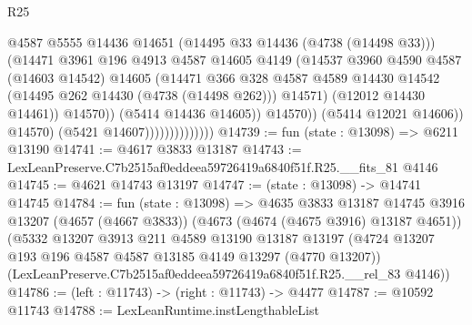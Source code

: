 \begin{lexlean}{R25}
\begin{coremodule}
                                          @4587
                                          @5555
                                          @14436
                                          @14651
                                          (@14495 @33 @14436 (@4738 (@14498 @33)))
                                          (@14471
                                            @3961
                                            @196
                                            @4913
                                            @4587
                                            @14605
                                            @4149
                                            (@14537
                                              @3960
                                              @4590
                                              @4587
                                              (@14603 @14542)
                                              @14605
                                              (@14471
                                                @366
                                                @328
                                                @4587
                                                @4589
                                                @14430
                                                @14542
                                                (@14495 @262 @14430 (@4738 (@14498 @262)))
                                                @14571)
                                              (@12012 @14430 @14461))
                                            @14570))
                                        (@5414 @14436 @14605))
                                      @14570))
                                  (@5414 @12021 @14606))
                                @14570)
                              (@5421 @14607))))))))))))))
@14739 := fun (state : @13098) => @6211 @13190
@14741 := @4617 @3833 @13187
@14743 := LexLeanPreserve.C7b2515af0eddeea59726419a6840f51f.R25.__fits_81 @4146
@14745 := @4621 @14743 @13197
@14747 := (state : @13098) -> @14741 @14745
@14784 := fun (state : @13098) =>
  @4635
    @3833
    @13187
    @14745
    @3916
    @13207
    (@4657 (@4667 @3833))
    (@4673 (@4674 (@4675 @3916) @13187 @4651))
    (@5332
      @13207
      @3913
      @211
      @4589
      @13190
      @13187
      @13197
      (@4724 @13207 @193 @196 @4587 @4587 @13185 @4149 @13297 (@4770 @13207))
      (LexLeanPreserve.C7b2515af0eddeea59726419a6840f51f.R25.__rel_83 @4146))
@14786 := (left : @11743) -> (right : @11743) -> @4477
@14787 := @10592 @11743
@14788 := LexLeanRuntime.instLengthableList

\end{coremodule}
\end{lexlean}
